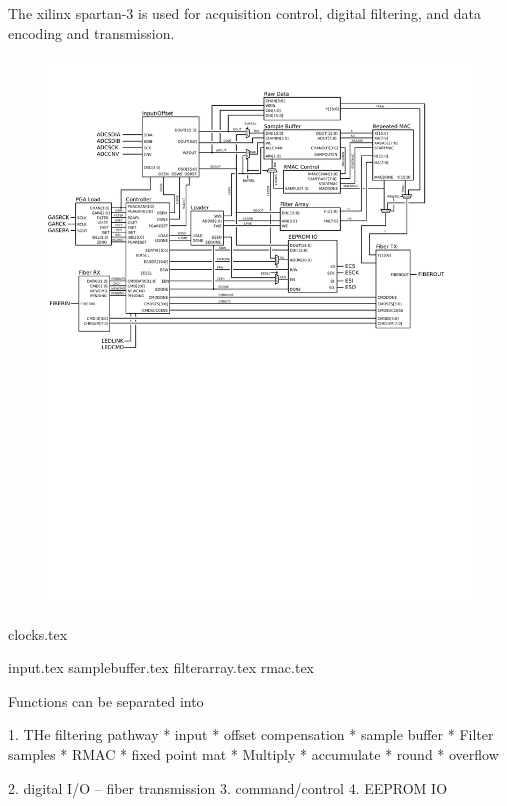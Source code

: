 The xilinx spartan-3 is used for acquisition control, digital filtering, and data encoding and transmission. 

\begin{figure}[h!]
\includegraphics[scale=1.0]{FPGA.svg}
\end{figure}

{clocks.tex}

{input.tex}
{samplebuffer.tex}
{filterarray.tex}
{rmac.tex}

Functions can be separated into

1. THe filtering pathway
  * input
  * offset compensation
  * sample buffer
  * Filter samples
  * RMAC
     * fixed point mat
     * Multiply
     * accumulate
     * round 
     * overflow
  
2. digital I/O -- fiber transmission
3. command/control
4. EEPROM IO
